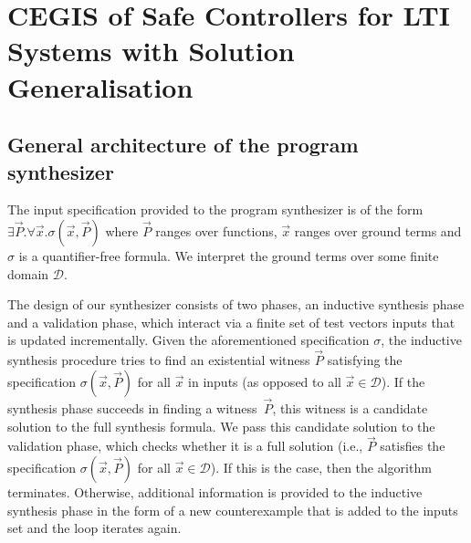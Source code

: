 \documentclass[runningheads,a4paper]{llncs}
\begin{document}


\section{CEGIS of Safe Controllers for LTI Systems with Solution Generalisation} 
\label{sec:CEGARIS} 

\subsection{General architecture of the program synthesizer}
\label{synthesizer-general}
The input specification provided to the program synthesizer is of the form
$\exists \vec{P} .  \forall \vec{x}.  \sigma(\vec{x}, \vec{P})$ where
$\vec{P}$ ranges over functions, $\vec{x}$ ranges over ground terms and
$\sigma$ is a quantifier-free formula.  We interpret the ground terms over
some finite domain $\mathcal{D}$.

The design of our synthesizer consists of two phases, an inductive
synthesis phase and a validation phase, which interact via a finite
set of test vectors {\sc inputs} that is updated incrementally.  Given
the aforementioned specification $\sigma$, the inductive synthesis
procedure tries to find an existential witness $\vec{P}$ satisfying
the specification $\sigma(\vec{x}, \vec{P})$ for all $\vec{x}$ in {\sc
  inputs} (as opposed to all $\vec{x} \in \mathcal{D}$).
%
If the synthesis phase succeeds in finding a witness~$\vec{P}$, this
witness is a candidate solution to the full synthesis formula.  We
pass this candidate solution to the validation phase, which checks
whether it is a full solution (i.e., $\vec{P}$ satisfies the
specification $\sigma(\vec{x}, \vec{P})$ for all
$\vec{x}\in\mathcal{D}$).  If this is the case, then the algorithm
terminates.  Otherwise, additional information is provided to the
inductive synthesis phase in the form of a new counterexample that is
added to the {\sc inputs} set and the loop iterates again.
\end{document}
